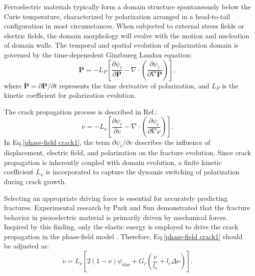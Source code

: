 Ferroelectric materials typically form a domain structure spontaneously below the Curie temperature, characterized by polarization arranged in a head-to-tail configuration in most circumstances. When subjected to external stress fields or electric fields, the domain morphology will evolve with the motion and nucleation of domain walls. The temporal and spatial evolution of polarization domain is governed by the time-depenedent Ginzbureg Landau equation:
\begin{equation}\label{TDGL}
    \dot{\mathbf{P}}=-L_P\left[ \frac{\partial \psi_t}{\partial \mathbf{P}}-\nabla \cdot \left( \frac{\partial\psi_t}{\partial \nabla\mathbf{P}} \right) \right],
\end{equation}
where $\dot{\mathbf{P}}=\partial \mathbf{P}/\partial t$ represents the time derivative of polarization, and $L_P$ is the kinetic coefficient for polarization evolution. 

The crack propagation process is described in Ref.\cite{abdollahi_phase-field_2011}:
\begin{equation}\label{phase-field crack1}
    \dot{\nu}=-L_\nu \left[ \frac{\partial\psi_t}{\partial v}-\nabla \cdot \left( \frac{\partial \psi_t}{\partial \nabla \nu} \right) \right].
\end{equation}
In Eq.\eqref{phase-field crack1}, the term $\partial\psi_t/\partial v$ describes the influence of displacement, electric field, and polarization on the fracture evolution. Since crack propagation is inherently coupled with domain evolution, a finite kinetic coefficient $L_\nu$ is incorporated to capture the dynamic switching of polarization during crack growth.

Selecting an appropriate driving force is essential for accurately predicting fractures. Experimental research by Park and Sun \cite{park_fracture_1995} demonstrated that the fracture behavior in piezoelectric material is primarily driven by mechanical forces. Inspired by this finding, only the elastic energy is employed to drive the crack propagation in the phase-field model \cite{wu_phase-field_2021}. Therefore, Eq.\eqref{phase-field crack1} should be adjusted as:
\begin{equation}\label{phase-field crack2}
    \dot{\nu}=L_\nu\left[ 2(1-\nu) \psi_\mathrm{elas}+G_c\left(\frac{\nu}{l_c} +l_c\Delta \nu\right) \right].
\end{equation}

